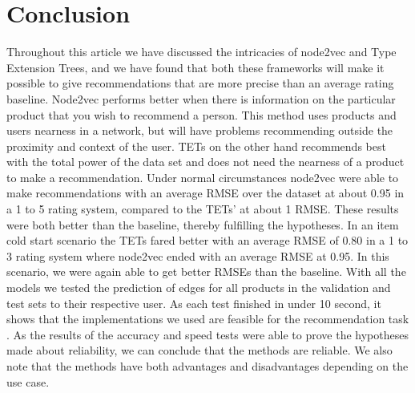 \section{Conclusion}
Throughout this article we have discussed the intricacies of node2vec and Type Extension Trees, and we have found that both these frameworks will make it possible to give recommendations that are more precise than an average rating baseline.
Node2vec performs better when there is information on the particular product that you wish to recommend a person.
This method uses products and users nearness in a network, but will have problems recommending outside the proximity and context of the user.
TETs on the other hand recommends best with the total power of the data set and does not need the nearness of a product to make a recommendation.
Under normal circumstances node2vec were able to make recommendations with an average RMSE over the dataset at about 0.95 in a 1 to 5 rating system, compared to the TETs' at about 1 RMSE.
These results were both better than the baseline, thereby fulfilling the hypotheses.
In an item cold start scenario the TETs fared better with an average RMSE of 0.80 in a 1 to 3 rating system where node2vec ended with an average RMSE at 0.95.
In this scenario, we were again able to get better RMSEs than the baseline.
With all the models we tested  the prediction of edges for all products in the validation and test sets to their respective user.
As each test finished in under 10 second, it shows that the implementations we used are feasible for the recommendation task .
As the results of the accuracy and speed tests were able to prove the hypotheses made about reliability, we can conclude that the methods are reliable.
We also note that the methods have both advantages and disadvantages depending on the use case. 
